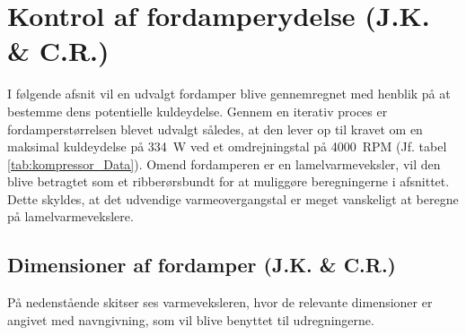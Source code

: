 \documentclass[../Hovedrapport.tex]{subfiles}
\begin{document}
\section{Kontrol af fordamperydelse (J.K. \& C.R.)}
    \label{sec:dim_fordamper}
I følgende afsnit vil en udvalgt fordamper blive gennemregnet med henblik på at bestemme dens potentielle kuldeydelse. Gennem en iterativ proces er fordamperstørrelsen blevet udvalgt således, at den lever op til kravet om en maksimal kuldeydelse på \SI{334}{W} ved et omdrejningstal på \SI{4000}{RPM} (Jf. tabel \ref{tab:kompressor_Data}). Omend fordamperen er en lamelvarmeveksler, vil den blive betragtet som et ribberørsbundt for at muliggøre beregningerne i afsnittet. Dette skyldes, at det udvendige varmeovergangstal er meget vanskeligt at beregne på lamelvarmevekslere.

\subsection{Dimensioner af fordamper  (J.K. \& C.R.)}
På nedenstående skitser ses varmeveksleren, hvor de relevante dimensioner er angivet med navngivning, som vil blive benyttet til udregningerne.
\end{document}
